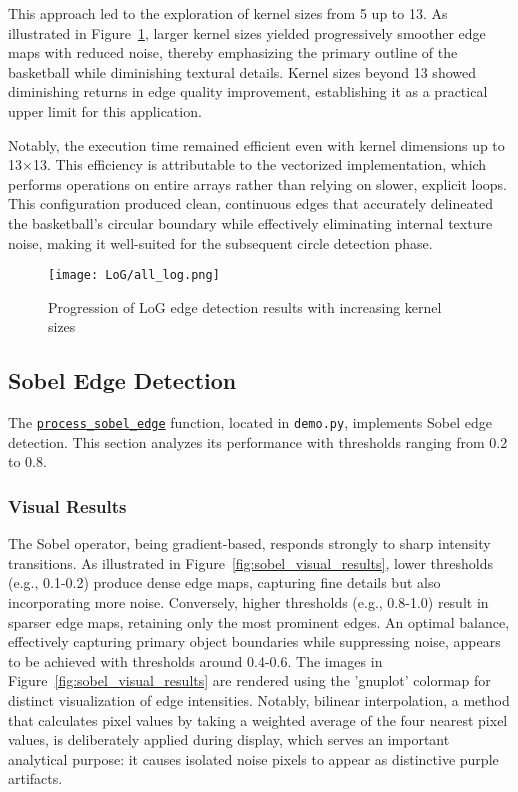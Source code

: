 \documentclass[12pt,a4paper]{article}
\begin{document}
This approach led to the exploration of kernel sizes from 5 up to 13. As illustrated in Figure~\ref{fig:log_edges}, larger kernel sizes yielded progressively smoother edge maps with reduced noise, thereby emphasizing the primary outline of the basketball while diminishing textural details. Kernel sizes beyond 13 showed diminishing returns in edge quality improvement, establishing it as a practical upper limit for this application.

Notably, the execution time remained efficient even with kernel dimensions up to 13×13. This efficiency is attributable to the vectorized implementation, which performs operations on entire arrays rather than relying on slower, explicit loops. This configuration produced clean, continuous edges that accurately delineated the basketball's circular boundary while effectively eliminating internal texture noise, making it well-suited for the subsequent circle detection phase.



\begin{figure}[H]
    \centering
    \texttt{[image: LoG/all\_log.png]}    
    \caption{Progression of LoG edge detection results with increasing kernel sizes}
    \label{fig:log_edges}
\end{figure}










\subsection{Sobel Edge Detection}
The \href{Code/demo.py}{\texttt{process\_sobel\_edge}} function, located in \texttt{demo.py}, implements Sobel edge detection. This section analyzes its performance with thresholds ranging from 0.2 to 0.8.

\subsubsection*{Visual Results}
The Sobel operator, being gradient-based, responds strongly to sharp intensity transitions. As illustrated in Figure~\ref{fig:sobel_visual_results}, lower thresholds (e.g., 0.1-0.2) produce dense edge maps, capturing fine details but also incorporating more noise. Conversely, higher thresholds (e.g., 0.8-1.0) result in sparser edge maps, retaining only the most prominent edges. An optimal balance, effectively capturing primary object boundaries while suppressing noise, appears to be achieved with thresholds around 0.4-0.6. The images in Figure~\ref{fig:sobel_visual_results} are rendered using the 'gnuplot' colormap for distinct visualization of edge intensities. Notably, bilinear interpolation, a method that calculates pixel values by taking a weighted average of the four nearest pixel values, is deliberately applied during display, which serves an important analytical purpose: it causes isolated noise pixels to appear as distinctive purple artifacts.
\end{document}
